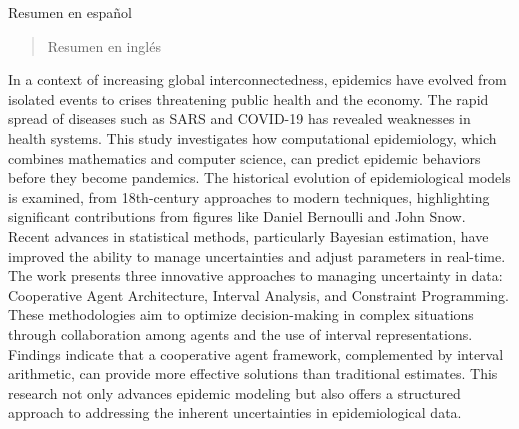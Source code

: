 \begin{resumen}
	Resumen en español
\end{resumen}

\begin{abstract}
	Resumen en inglés
\end{abstract}


In a context of increasing global interconnectedness, epidemics have evolved from isolated events to crises threatening public health and the economy. The rapid spread of diseases such as SARS and COVID-19 has revealed weaknesses in health systems. This study investigates how computational epidemiology, which combines mathematics and computer science, can predict epidemic behaviors before they become pandemics.
The historical evolution of epidemiological models is examined, from 18th-century approaches to modern techniques, highlighting significant contributions from figures like Daniel Bernoulli and John Snow. Recent advances in statistical methods, particularly Bayesian estimation, have improved the ability to manage uncertainties and adjust parameters in real-time.
The work presents three innovative approaches to managing uncertainty in data: Cooperative Agent Architecture, Interval Analysis, and Constraint Programming. These methodologies aim to optimize decision-making in complex situations through collaboration among agents and the use of interval representations. Findings indicate that a cooperative agent framework, complemented by interval arithmetic, can provide more effective solutions than traditional estimates. This research not only advances epidemic modeling but also offers a structured approach to addressing the inherent uncertainties in epidemiological data.
